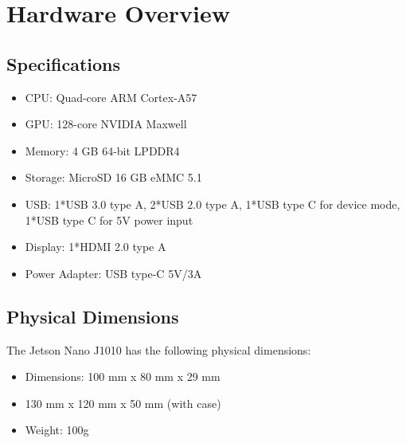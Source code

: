 %
%

\chapter{Hardware Overview}

\section{Specifications}
\begin{itemize}[label=--,left=1.5em]
	\item CPU: Quad-core ARM Cortex-A57
	\item GPU: 128-core NVIDIA Maxwell
	\item Memory: 4 GB 64-bit LPDDR4
	\item Storage: MicroSD 16 GB eMMC 5.1
	\item USB: 1*USB 3.0 type A, 2*USB 2.0 type A, 1*USB type C for device mode, 1*USB type C for 5V power input
	\item Display: 1*HDMI 2.0 type A
	\item Power Adapter: USB type-C 5V/3A
\end{itemize}

\section{Physical Dimensions}
The Jetson Nano J1010 has the following physical dimensions:
\begin{itemize}[label=--,left=1.5em]
	\item Dimensions: 100 mm x 80 mm x 29 mm
	\item 130 mm x 120 mm x 50 mm (with case)
	\item Weight: 100g
\end{itemize}
